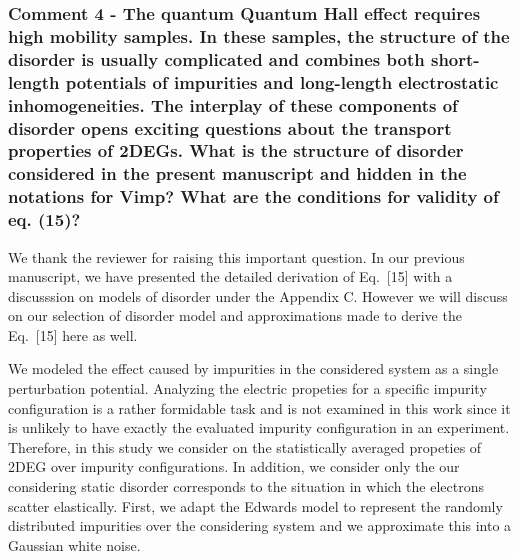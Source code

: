 \documentclass{article}
\begin{document}
\subsubsection*{Comment 4 -
\color{RoyalBlue} The quantum Quantum Hall effect requires high mobility samples. In these samples, the structure of the disorder is usually complicated and combines both short-length potentials of impurities and long-length electrostatic inhomogeneities. The interplay of these components of disorder opens exciting questions about the transport properties of 2DEGs. What is the structure of disorder considered in the present manuscript and hidden in the notations for Vimp? What are the conditions for validity of eq. (15)?
}

We thank the reviewer for raising this important question. In our previous manuscript, we have presented the detailed derivation of Eq.~[15] with a discusssion on models of disorder under the Appendix C. However we will discuss on our selection of disorder model and approximations made to derive the Eq.~[15] here as well.

We modeled the effect caused by impurities in the considered system as a single perturbation potential. Analyzing the electric propeties for a specific impurity configuration is a rather formidable task and is not examined in this work since it is unlikely to have exactly the evaluated impurity configuration in an experiment. Therefore, in this study we consider on the statistically averaged propeties of 2DEG over impurity configurations. In addition, we consider only the our considering static disorder corresponds to the situation in which the electrons scatter elastically. First, we adapt the Edwards model \cite{akkermans10} to represent the randomly distributed impurities over the considering system and we approximate this into a Gaussian white noise.
\end{document}
